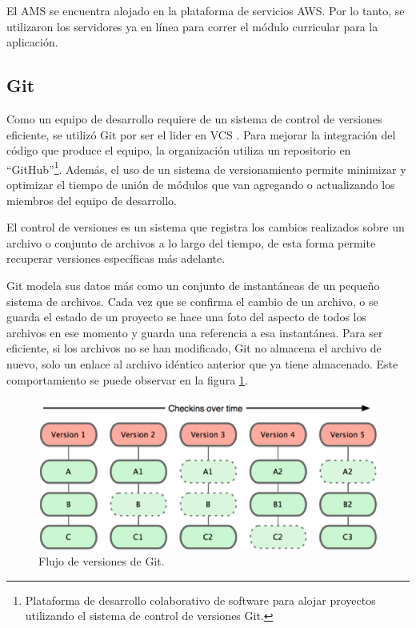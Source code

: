 El AMS se encuentra alojado en la plataforma de servicios AWS. Por lo tanto, se utilizaron los servidores ya en línea para correr el módulo curricular para la aplicación.

\subsection{Git}
Como un equipo de desarrollo requiere de un sistema de control de versiones eficiente, se utilizó Git por ser el lider en VCS \citep{loeliger2012version}. Para mejorar la integración del código que produce el equipo, la organización utiliza un repositorio en \enquote{GitHub}\footnote{Plataforma de desarrollo colaborativo de software para alojar proyectos utilizando el sistema de control de versiones Git.}. Además, el uso de un sistema de versionamiento permite minimizar y optimizar el tiempo de unión de módulos que van agregando o actualizando los miembros del equipo de desarrollo.

El control de versiones es un sistema que registra los cambios realizados sobre un archivo o conjunto de archivos a lo largo del tiempo, de esta forma permite recuperar versiones específicas más adelante\citep{chacon2014pro}.

Git modela sus datos más como un conjunto de instantáneas de un pequeño sistema de archivos. Cada vez que se confirma el cambio de un archivo, o se guarda el estado de un proyecto se hace una foto del aspecto de todos los archivos en ese momento y guarda una referencia a esa instantánea. Para ser eficiente, si los archivos no se han modificado, Git no almacena el archivo de nuevo, solo un enlace al archivo idéntico anterior que ya tiene almacenado. Este comportamiento se puede observar en la figura \ref{graph_git}.

\begin{figure}[H]
\centering
\includegraphics[width=125mm,scale=1]{Figuras/tecnologias/git_over_time}
\caption{Flujo de versiones de Git\citep{chacon2014pro}.}
  \label{graph_git}
\end{figure}

